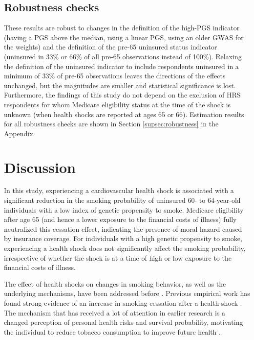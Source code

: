 \documentclass[11pt]{article}
\begin{document}
\subsection{Robustness checks} \label{sec:robustness}
These results are robust to changes in the definition of the high-PGS indicator (having a PGS above the median, using a linear PGS, using an older GWAS for the weights) and the definition of the pre-65 uninsured status indicator (uninsured in 33\% or 66\% of all pre-65 observations instead of 100\%). %
Relaxing the definition of the uninsured indicator to include respondents uninsured in a minimum of 33\% of pre-65 observations leaves the directions of the effects unchanged, but the magnitudes are smaller and statistical significance is lost.
Furthermore, the findings of this study do not depend on the exclusion of HRS respondents for whom Medicare eligibility status at the time of the shock is unknown (when health shocks are reported at ages 65 or 66).
Estimation results for all robustness checks are shown in Section \ref{supsec:robustness} in the Appendix.


\section{Discussion} \label{sec:discussion}

In this study, experiencing a cardiovascular health shock is associated with a significant reduction in the smoking probability of uninsured 60- to 64-year-old individuals with a low index of genetic propensity to smoke.
Medicare eligibility after age 65 (and hence a lower exposure to the financial costs of illness) fully neutralized this cessation effect, indicating the presence of moral hazard caused by insurance coverage.
For individuals with a high genetic propensity to smoke, experiencing a health shock does not significantly affect the smoking probability, irrespective of whether the shock is at a time of high or low exposure to the financial costs of illness.


The effect of health shocks on changes in smoking behavior, as well as the underlying mechanisms, have been addressed before \citep{Wray1998,Smith2001,Clark2002,Falba2005,Khwaja2006spouse,Khwaja2006learn,Keenan2009,Sundmacher2012,Richards2014,Marti2017}.
Previous empirical work has found strong evidence of an increase in smoking cessation after a health shock \citep{Wray1998,Clark2002,Falba2005,Keenan2009,Sundmacher2012,Richards2014,Marti2017}.
The mechanism that has received a lot of attention in earlier research is a changed perception of personal health risks and survival probability, motivating the individual to reduce tobacco consumption to improve future health \citep{Smith2001,Clark2002,Khwaja2006spouse,Khwaja2006learn}.
\end{document}
